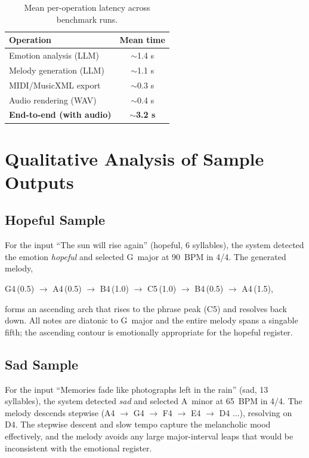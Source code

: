 \begin{table}[ht]
\centering
\caption[Latency profile]{Mean per-operation latency across benchmark runs.}
\label{tab:latency}
\begin{tabular}{l c}
\toprule
\textbf{Operation} & \textbf{Mean time} \\
\midrule
Emotion analysis (LLM) & $\sim$1.4 s \\
Melody generation (LLM) & $\sim$1.1 s \\
MIDI/MusicXML export & $\sim$0.3 s \\
Audio rendering (WAV) & $\sim$0.4 s \\
\midrule
\textbf{End-to-end (with audio)} & \textbf{$\sim$3.2 s} \\
\bottomrule
\end{tabular}
\end{table}

\section{Qualitative Analysis of Sample Outputs}
\label{sec:ev-qualitative}

\subsection{Hopeful Sample}

For the input \enquote{The sun will rise again} (hopeful, 6 syllables), the
system detected the emotion \emph{hopeful} and selected G~major at 90~BPM in
4/4. The generated melody,
\begin{center}
G4\,(0.5) $\rightarrow$ A4\,(0.5) $\rightarrow$ B4\,(1.0) $\rightarrow$
C5\,(1.0) $\rightarrow$ B4\,(0.5) $\rightarrow$ A4\,(1.5),
\end{center}
forms an ascending arch that rises to the phrase peak (C5) and resolves
back down. All notes are diatonic to G~major and the entire melody spans a
singable fifth; the ascending contour is emotionally appropriate for the
hopeful register.

\subsection{Sad Sample}

For the input \enquote{Memories fade like photographs left in the rain}
(sad, 13 syllables), the system detected \emph{sad} and selected A~minor at
65~BPM in 4/4. The melody descends stepwise (A4 $\rightarrow$ G4
$\rightarrow$ F4 $\rightarrow$ E4 $\rightarrow$ D4 $\ldots$), resolving on
D4. The stepwise descent and slow tempo capture the melancholic mood
effectively, and the melody avoids any large major-interval leaps that would
be inconsistent with the emotional register.

